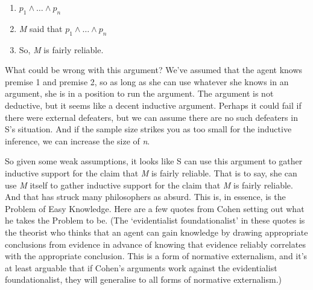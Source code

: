 \begin{enumerate}
\item{} $p_1 \wedge \dots \wedge p_n$

\item{} \emph{M} said that $p_1 \wedge \dots \wedge p_n$

\item{} So, \emph{M} is fairly reliable.

\end{enumerate}
What could be wrong with this argument? We've assumed that the agent knows premise 1 and premise 2, so as long as she can use whatever she knows in an argument, she is in a position to run the argument. The argument is not deductive, but it seems like a decent inductive argument. Perhaps it could fail if there were external defeaters, but we can assume there are no such defeaters in S's situation. And if the sample size strikes you as too small for the inductive inference, we can increase the size of \emph{n}.

So given some weak assumptions, it looks like S can use this argument to gather inductive support for the claim that \emph{M} is fairly reliable. That is to say, she can use \emph{M} itself to gather inductive support for the claim that \emph{M} is fairly reliable. And that has struck many philosophers as absurd. This is, in essence, is the Problem of Easy Knowledge. Here are a few quotes from Cohen setting out what he takes the Problem to be. (The `evidentialist foundationalist' in these quotes is the theorist who thinks that an agent can gain knowledge by drawing appropriate conclusions from evidence in advance of knowing that evidence reliably correlates with the appropriate conclusion. This is a form of normative externalism, and it's at least arguable that if Cohen's arguments work against the evidentialist foundationalist, they will generalise to all forms of normative externalism.)

